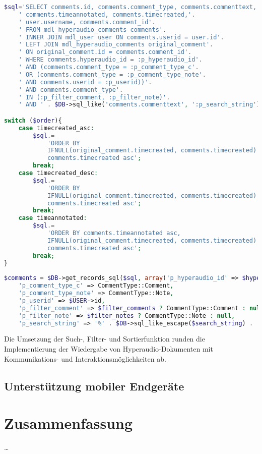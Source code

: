 \begin{lstlisting}[language=php,
             linewidth=\textwidth,
             caption={Ausschnitt der \textbf{external.php} in der 11. Iteration},
             label={lst:it11:external}]
$sql='SELECT comments.id, comments.comment_type, comments.commenttext,'.
    ' comments.timeannotated, comments.timecreated,'.
    ' user.username, comments.comment_id'.
    ' FROM mdl_hyperaudio_comments comments'.
    ' INNER JOIN mdl_user user ON comments.userid = user.id'.
    ' LEFT JOIN mdl_hyperaudio_comments original_comment'.
    ' ON original_comment.id = comments.comment_id'.
    ' WHERE comments.hyperaudio_id = :p_hyperaudio_id'.
    ' AND (comments.comment_type = :p_comment_type_c'.
    ' OR (comments.comment_type = :p_comment_type_note'.
    ' AND comments.userid = :p_userid))'.
    ' AND comments.comment_type'.
    ' IN (:p_filter_comment, :p_filter_note)'.
    ' AND ' . $DB->sql_like('comments.commenttext', ':p_search_string');

switch ($order){
    case timecreated_asc:
        $sql.= 
            'ORDER BY
            IFNULL(original_comment.timecreated, comments.timecreated) asc,
            comments.timecreated asc';
        break;
    case timecreated_desc:
        $sql.= 
            'ORDER BY
            IFNULL(original_comment.timecreated, comments.timecreated) desc,
            comments.timecreated asc';
        break;
    case timeannotated:
        $sql.=
            'ORDER BY comments.timeannotated asc,
            IFNULL(original_comment.timecreated, comments.timecreated) asc,
            comments.timecreated asc';
        break;
}
        
$comments = $DB->get_records_sql($sql, array('p_hyperaudio_id' => $hyperaudio_id,
    'p_comment_type_c' => CommentType::Comment,
    'p_comment_type_note' => CommentType::Note,
    'p_userid' => $USER->id,
    'p_filter_comment' => $filter_comments ? CommentType::Comment : null,
    'p_filter_note' => $filter_notes ? CommentType::Note : null,
    'p_search_string' => '%' . $DB->sql_like_escape($search_string) . '%'));
\end{lstlisting}

Die Umsetzung der Such-, Filter- und Sortierfunktion runden die Implementierung der Wiedergabe von Hyperaudio-Dokumenten mit Kommunikations- und Interaktionsmöglichkeiten ab.

\subsection{Unterstützung mobiler Endgeräte}


\section{Zusammenfassung}
\dots